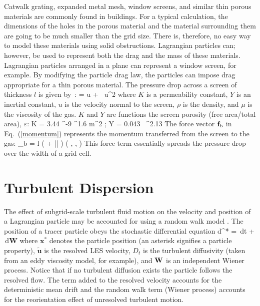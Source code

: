 Catwalk grating, expanded metal mesh, window screens, and similar thin porous materials are commonly found in buildings.  For a typical calculation, the dimensions of the holes in the porous material and the material surrounding them are going to be much smaller than the grid size.  There is, therefore, no easy way to model these materials using solid obstructions. Lagrangian particles can; however, be used to represent both the drag and the mass of these materials. Lagrangian particles arranged in a plane can represent a window screen, for example. By modifying the particle drag law, the particles can impose drag appropriate for a thin porous material.  The pressure drop across a screen of thickness $l$ is given by~\cite{Bartzanas:1}:
\be
    =   u + \rho {} \, u^2
\ee
where $K$ is a permeability constant, $Y$ is an inertial constant, $u$ is the velocity normal to the screen, $\rho$ is the density, and $\mu$ is the viscosity of the gas.  $K$ and $Y$ are functions the screen porosity (free area/total area), $\varepsilon$:
\be
   K = 3.44 ^{-9} \; \varepsilon^{1.6} \; \; \hbox{m}^2 \quad ; \quad Y = 0.043 \, \varepsilon^{2.13}
\ee
The force vector ${\bf f}_{\rm b}$ in Eq.~(\ref{momentum}) represents the momentum transferred from the screen to the gas:
\be
   \bof_{\rm b} = l \; \left(  + \rho {} |\bu| \right) \left(  ,  ,  \right)
\ee
This force term essentially spreads the pressure drop over the width of a grid cell.




\section{Turbulent Dispersion}

The effect of subgrid-scale turbulent fluid motion on the velocity and position of a Lagrangian particle may be accounted for using a random walk model \cite{Raman:CF}.  The position of a tracer particle obeys the stochastic differential equation
\be
\mbox{d}^* =  \,\mbox{d}t +  \,\mbox{d}\mbox{\textbf{W}}
\ee
where $\mathbf{x}^*$ denotes the particle position (an asterisk signifies a particle property), $\tilde{\mathbf{u}}$ is the resolved LES velocity, $D_t$ is the turbulent diffusivity (taken from an eddy viscosity model, for example), and $\mbox{\textbf{W}}$ is an independent Wiener process.  Notice that if no turbulent diffusion exists the particle follows the resolved flow.  The term added to the resolved velocity accounts for the deterministic mean drift and the random walk term (Wiener process) accounts for the reorientation effect of unresolved turbulent motion.

